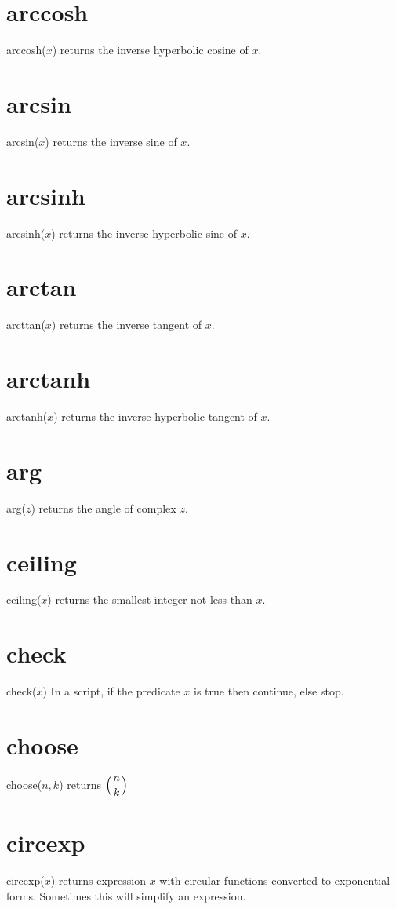 \documentclass[12pt,openany]{report}
\begin{document}
\section*{arccosh}
arccosh($x$) returns the inverse hyperbolic cosine of $x$.

\section*{arcsin}
arcsin($x$) returns the inverse sine of $x$.

\section*{arcsinh}
arcsinh($x$) returns the inverse hyperbolic sine of $x$.

\section*{arctan}
arcttan($x$) returns the inverse tangent of $x$.

\section*{arctanh}
arctanh($x$) returns the inverse hyperbolic tangent of $x$.

\section*{arg}
arg($z$) returns the angle of complex $z$.

\section*{ceiling}
ceiling($x$) returns the smallest integer not less than $x$.

\section*{check}
check($x$) In a script, if the predicate $x$ is true then continue, else stop.

\section*{choose}
choose($n,k$) returns $\displaystyle\left({n \atop k}\right)$

\section*{circexp}
circexp($x$) returns expression $x$ with circular functions converted
to exponential forms.
Sometimes this will simplify an expression.
\end{document}
